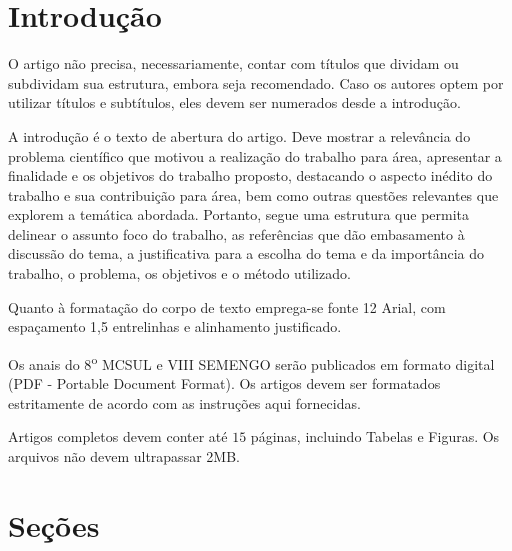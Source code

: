 \documentclass[12pt,A4,A4pt]{article}
\begin{document}


\newpage
 \onehalfspacing
\section{Introdução}

 {\fontsize{12pt}{\baselineskip}\selectfont}
 
\hspace{0.5cm}O artigo não precisa, necessariamente, contar com títulos que dividam ou subdividam sua estrutura, embora seja recomendado. Caso os autores optem por utilizar títulos e subtítulos, eles devem ser numerados desde a introdução.

A introdução é o texto de abertura do artigo. Deve mostrar a relevância do problema científico que motivou a realização do trabalho para área, apresentar a finalidade e os objetivos do trabalho proposto, destacando o aspecto inédito do trabalho e sua contribuição para área, bem como outras questões relevantes que explorem a temática abordada. Portanto, segue uma estrutura que permita delinear o assunto foco do trabalho, as referências que dão embasamento à discussão do tema, a justificativa para a escolha do tema e da importância do trabalho, o problema, os objetivos e o método utilizado. 

Quanto à formatação do corpo de texto emprega-se fonte 12 Arial, com espaçamento 1,5 entrelinhas e alinhamento justificado. 

Os anais do 8\textsuperscript{o} MCSUL e VIII SEMENGO serão publicados em formato digital (PDF - Portable Document Format). Os artigos devem ser formatados estritamente de acordo com as instruções aqui fornecidas. 

Artigos completos devem conter até $15$ páginas, incluindo Tabelas e Figuras. Os arquivos não devem ultrapassar 2MB.


\section{Seções}
\label{secoes}
\end{document}
